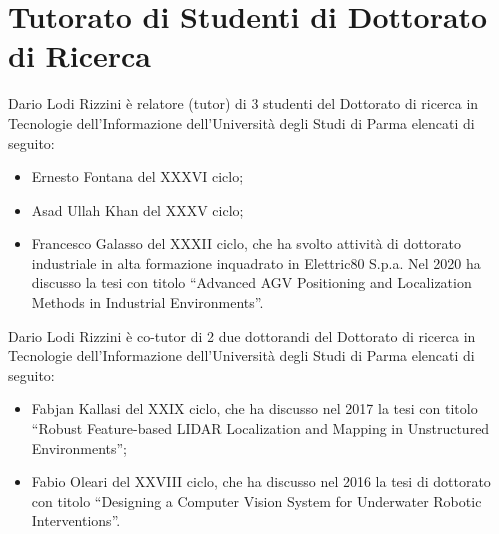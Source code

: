 \documentclass[11pt]{article}
\begin{document}

\section*{Tutorato di Studenti di Dottorato di Ricerca}

Dario Lodi Rizzini \`e relatore (tutor) di 3 studenti del Dottorato di ricerca in Tecnologie dell'Informazione dell'Universit\`a degli Studi di Parma elencati di seguito:
\begin{itemize}
\item Ernesto Fontana del XXXVI ciclo;
\item Asad Ullah Khan del XXXV ciclo;
\item Francesco Galasso del XXXII ciclo, che ha svolto attivit\`a di dottorato industriale in alta formazione inquadrato in Elettric80 S.p.a. 
  Nel 2020 ha discusso la tesi con titolo ``Advanced AGV Positioning and Localization Methods in Industrial Environments''.
\end{itemize}
%
\vspace{3mm}
%
Dario Lodi Rizzini \`e co-tutor di 2 due dottorandi del Dottorato di ricerca in Tecnologie dell'Informazione dell'Universit\`a degli Studi di Parma elencati di seguito:
\begin{itemize}
\item Fabjan Kallasi del XXIX ciclo, che ha discusso nel 2017 la tesi con titolo ``Robust Feature-based LIDAR Localization and Mapping in Unstructured Environments'';
\item Fabio Oleari del XXVIII ciclo, che ha discusso nel 2016 la tesi di dottorato con titolo ``Designing a Computer Vision System for Underwater Robotic Interventions''.
\end{itemize}

\end{document}
